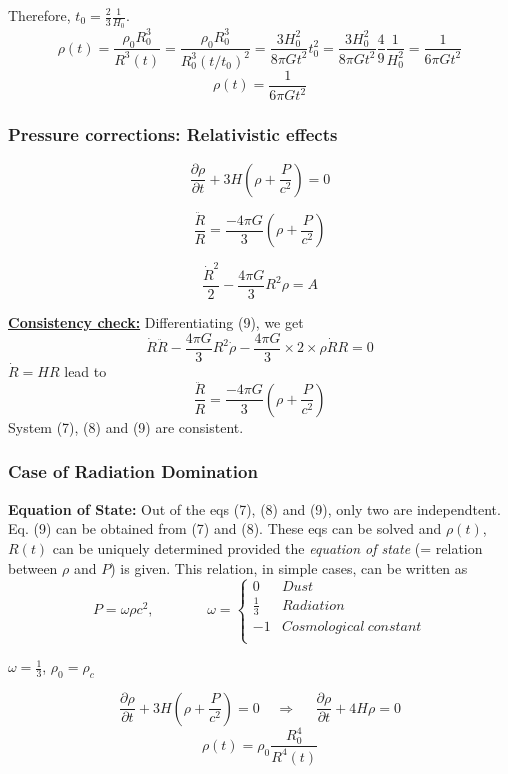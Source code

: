 \documentclass[xcolor=dvipsnames]{beamer}
\begin{document}
\begin{frame}
Therefore, $t_0 = \frac{2}{3}\frac{1}{H_0}$.
\[ \rho(t) = \frac{\rho_0 R_0^3}{R^3(t)}=\frac{\rho_0R_0^3}{R_0^3(t/t_0)^2}
 = \frac{3H_0^2}{8\pi Gt^2} t_0^2 =\frac{3H_0^2}{8\pi Gt^2}\frac{4}{9}
\frac{1}{H_0^2} = \frac{1}{6\pi Gt^2}\]
\[ \boxed{\rho(t) =  \frac{1}{6\pi Gt^2} } \]
\end{frame}

\begin{frame}
\frametitle{Pressure corrections: Relativistic effects}
\begin{equation}
\frac{\partial\rho}{\partial t} + 3H\left(\rho + \frac{P}{c^2}\right) = 0
\end{equation}

\begin{equation}
\frac{\ddot{R}}{R} = \frac{-4\pi G}{3}\left(\rho + \frac{P}{c^2}\right)
\end{equation}

\begin{equation}
\frac{\dot{R}^2}{2} - \frac{4\pi G}{3}R^2\rho = A
\end{equation}
\pause

\underline{\bf Consistency check:} Differentiating (9), we get
\[ \dot{R}\ddot{R}-\frac{4\pi G}{3}R^2\dot{\rho} - \frac{4\pi G}{3}\times 2
\times\rho\dot{R}R = 0 \]
$\dot{R} = HR$ lead to
\[ \boxed{
\frac{\ddot{R}}{R} = \frac{-4\pi G}{3}\left(\rho + \frac{P}{c^2}\right) }\]
System (7), (8) and (9) are consistent.
\end{frame}


\begin{frame}
\frametitle{Case of Radiation Domination}
{\bf Equation of State:} Out of the eqs (7), (8) and (9), only two are
independtent.
Eq. (9) can be obtained from (7) and (8). These eqs can be solved and $\rho(t)$, $R(t)$ can be uniquely determined provided the {\em equation of state} 
(= relation between $\rho$ and $P$) is given. This relation, in simple cases,
can be written as
\[ P = \omega\rho c^2,~~~~~~~~~~~~~~~~~
\omega = \left\{
\begin{array}{ll}
0 & Dust\\
\frac{1}{3} & Radiation\\
-1 & Cosmological~constant\\
\end{array} \right. \]

$\omega=\frac{1}{3}$, $\rho_0=\rho_c$

\[ \frac{\partial\rho}{\partial t} + 3H\left(\rho+\frac{P}{c^2}\right)=0
~~~~~\Rightarrow~~~~~~\frac{\partial\rho}{\partial t} +4H\rho = 0 \]
\[ \boxed{ \rho(t) = \rho_0 \frac{R_0^4}{R^4(t)} } \]
\end{frame}
\end{document}
